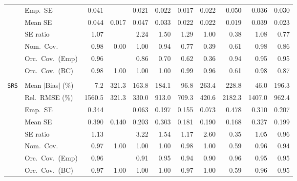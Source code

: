 \begin{landscape}
\begin{longtable}{llrrrrrrrrr}
 & Emp.\ SE & 0.041 &  & 0.021 & 0.022 & 0.017 & 0.022 & 0.050 & 0.036 & 0.030 \\
 & Mean SE & 0.044 & 0.017 & 0.047 & 0.033 & 0.022 & 0.022 & 0.019 & 0.039 & 0.023 \\
 & SE ratio & \cellcolor{ranktwo}1.07 &  & 2.24 & 1.50 & 1.29 & \cellcolor{rankone}1.00 & 0.38 & \cellcolor{rankthree}1.08 & 0.77 \\
 & Nom.\ Cov. & \cellcolor{ranktwo}0.98 & 0.00 & \cellcolor{rankthree}1.00 & \cellcolor{rankone}0.94 & 0.77 & 0.39 & 0.61 & \cellcolor{ranktwo}0.98 & 0.86 \\
 & Orc.\ Cov.\ (Emp) & \cellcolor{ranktwo}0.96 &  & \cellcolor{rankthree}0.86 & 0.70 & 0.62 & 0.36 & \cellcolor{ranktwo}0.94 & \cellcolor{rankone}0.95 & \cellcolor{rankone}0.95 \\
 & Orc.\ Cov.\ (BC) & \cellcolor{ranktwo}0.98 & 1.00 & 1.00 & 1.00 & \cellcolor{rankthree}0.99 & \cellcolor{rankone}0.96 & 0.61 & \cellcolor{ranktwo}0.98 & 0.87 \\
\addlinespace[2pt]
\multicolumn{11}{l}{\textbf{Binary \& Categorical Phase-One Covariates}} \\
\addlinespace[2pt]
\quad \texttt{SRS} & Mean $|$Bias$|$ (\%) & \cellcolor{rankone}7.2 & 321.3 & 163.8 & 184.1 & \cellcolor{rankthree}96.8 & 263.4 & 228.8 & \cellcolor{ranktwo}46.0 & 196.3 \\
 & Rel.\ RMSE (\%) & 1560.5 & \cellcolor{rankone}321.3 & \cellcolor{ranktwo}330.0 & 913.0 & 709.3 & \cellcolor{rankthree}420.6 & 2182.3 & 1407.0 & 962.4 \\
 & Emp.\ SE & 0.344 &  & 0.063 & 0.197 & 0.155 & 0.073 & 0.478 & 0.310 & 0.207 \\
 & Mean SE & 0.390 & 0.140 & 0.203 & 0.303 & 0.181 & 0.190 & 0.168 & 0.327 & 0.199 \\
 & SE ratio & \cellcolor{rankthree}1.13 &  & 3.22 & 1.54 & 1.17 & 2.60 & 0.35 & \cellcolor{ranktwo}1.05 & \cellcolor{rankone}0.96 \\
 & Nom.\ Cov. & \cellcolor{ranktwo}0.97 & 1.00 & 1.00 & 1.00 & \cellcolor{rankthree}0.98 & 1.00 & 0.59 & \cellcolor{rankone}0.96 & \cellcolor{rankone}0.94 \\
 & Orc.\ Cov.\ (Emp) & \cellcolor{ranktwo}0.96 &  & \cellcolor{rankthree}0.91 & \cellcolor{rankone}0.95 & \cellcolor{ranktwo}0.94 & 0.90 & \cellcolor{ranktwo}0.96 & \cellcolor{rankone}0.95 & \cellcolor{rankone}0.95 \\
 & Orc.\ Cov.\ (BC) & \cellcolor{rankthree}0.97 & 1.00 & 1.00 & 1.00 & \cellcolor{rankthree}0.97 & 1.00 & 0.59 & \cellcolor{ranktwo}0.96 & \cellcolor{rankone}0.95 \\

\end{longtable}
\end{landscape}
